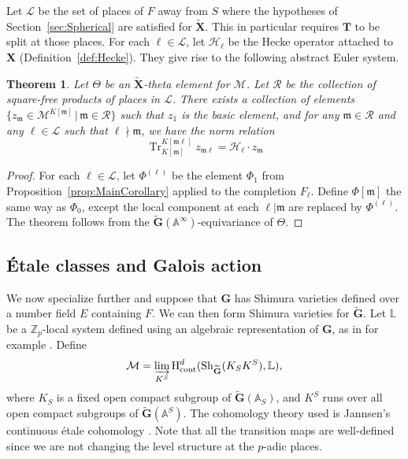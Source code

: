 \documentclass{amsart}
\newtheorem{theorem}{Theorem}[section]
\theoremstyle{definition}
\theoremstyle{remark}
\newcommand{\1}{\mathbf{1}}
\newcommand{\A}{\mathbb{A}}
\newcommand{\cont}{\mathrm{cont}}
\newcommand{\h}{\mathrm{H}}
\newcommand{\m}{\mathfrak{m}}
\newcommand{\mb}[1]{\mathbf{#1}}
\newcommand{\sh}[1]{\mathcal{#1}}
\newcommand{\Z}{\mathbb{Z}}
\DeclareMathOperator{\Tr}{Tr}
\theoremstyle{definition}
\newcommand{\bG}{\mathbf{G}}
\newcommand{\Sh}{\mathrm{Sh}}
\begin{document}
Let $\mathscr{L}$ be the set of places of $F$ away from $S$ where the hypotheses of Section~\ref{sec:Spherical} are satisfied for $\widetilde{\mb{X}}$. This in particular requires $\mb{T}$ to be split at those places. For each $\ell\in\mathscr{L}$, let $\sh{H}_\ell$ be the Hecke operator attached to $\mb{X}$ (Definition~\ref{def:Hecke}). They give rise to the following abstract Euler system.

\begin{theorem}\label{thm:Abstract}
  Let $\Theta$ be an $\widetilde{\mb{X}}$-theta element for $\sh{M}$. Let $\mathscr{R}$ be the collection of square-free products of places in $\mathscr{L}$. There exists a collection of elements $\{z_\m\in\sh{M}^{K[\m]}\,|\,\m\in\mathscr{R}\}$ such that $z_1$ is the basic element, and for any $\m\in\mathscr{R}$ and any $\ell\in\mathscr{L}$ such that $\ell\nmid\m$, we have the norm relation
  \[
    \Tr_{K[\m]}^{K[\m\ell]}z_{\m\ell}=\sh{H}_\ell\cdot z_\m
  \]
\end{theorem}
\begin{proof}
  For each $\ell\in\mathscr{L}$, let $\Phi^{(\ell)}$ be the element $\Phi_1$ from Proposition~\ref{prop:MainCorollary} applied to the completion $F_\ell$. Define $\Phi[\m]$ the same way as $\Phi_0$, except the local component at each $\ell|\m$ are replaced by $\Phi^{(\ell)}$. The theorem follows from the $\widetilde{\bG}(\A^\infty)$-equivariance of $\Theta$.
\end{proof}

\subsection{\'Etale classes and Galois action}\label{ss:MotivicES}
We now specialize further and suppose that $\mb{G}$ has Shimura varieties defined over a number field $E$ containing $F$. We can then form Shimura varieties for $\widetilde{\bG}$. Let $\mathbb{L}$ be a $\Z_p$-local system defined using an algebraic representation of $\mb{G}$, as in for example \cite[\S III.2]{HT2001}. Define
\begin{equation}\label{eqn:Motivic}
  \sh{M}=\varinjlim_{K^S}\h^d_\cont(\Sh_{\widetilde{\bG}}(K_SK^S),\mathbb{L}),
\end{equation}
where $K_S$ is a fixed open compact subgroup of $\widetilde{\bG}(\A_S)$, and $K^S$ runs over all open compact subgroups of $\widetilde{\bG}(\A^S)$. The cohomology theory used is Jannsen's continuous \'etale cohomology \cite{JannsenContEt}. Note that all the transition maps are well-defined since we are not changing the level structure at the $p$-adic places.
\end{document}
